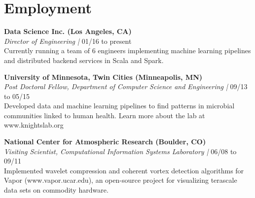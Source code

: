 
\section{\sc Employment}


{\bf Data Science Inc. (Los Angeles, CA)} \\
{\it Director of Engineering |} 01/16 to present \\
{\small Currently running a team of 6 engineers implementing machine learning pipelines and distributed backend services in Scala and Spark. }

{\bf University of Minnesota, Twin Cities (Minneapolis, MN)} \\
{\it Post Doctoral Fellow, Department of Computer Science and Engineering |} 09/13 to 05/15 \\
{\small Developed data and machine learning pipelines to find patterns in microbial communities linked to human health. Learn more about the lab at www.knightslab.org }


{\bf National Center for Atmospheric Research (Boulder, CO)} \\
{\it Visiting Scientist, Computational Information Systems Laboratory |} 06/08 to 09/11 \\
{\small Implemented wavelet compression and coherent vortex detection algorithms for Vapor (www.vapor.ucar.edu), an open-source project for visualizing terascale data sets on commodity hardware. }
  

